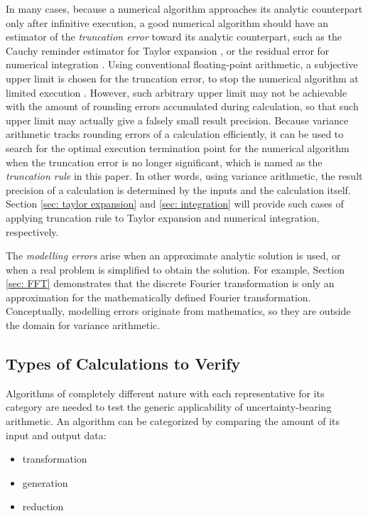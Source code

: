 \documentclass[twoside]{article}
\numberwithin{equation}{section}
\begin{document}
In many cases, because a numerical algorithm approaches its analytic counterpart only after infinitive execution, a good numerical algorithm should have an estimator of the \emph{truncation error} toward its analytic counterpart, such as the Cauchy reminder estimator for Taylor expansion \cite{Numerical_Recipes}, or the residual error for numerical integration \cite{Numerical_Recipes}.  
Using conventional floating-point arithmetic, a subjective upper limit is chosen for the truncation error, to stop the numerical algorithm at limited execution \cite{Numerical_Recipes}. 
However, such arbitrary upper limit may not be achievable with the amount of rounding errors accumulated during calculation, so that such upper limit may actually give a falsely small result precision. 
Because variance arithmetic tracks rounding errors of a calculation efficiently, it can be used to search for the optimal execution termination point for the numerical algorithm when the truncation error is no longer significant, which is named as the \emph{truncation rule} in this paper. In other words, using variance arithmetic, the result precision of a calculation is determined by the inputs and the calculation itself.  
Section \ref{sec: taylor expansion} and \ref{sec: integration} will provide such cases of applying truncation rule to Taylor expansion and numerical integration, respectively.

The \emph{modelling errors} arise when an approximate analytic solution is used, or when a real problem is simplified to obtain the solution.  
For example, Section \ref{sec: FFT} demonstrates that the discrete Fourier transformation is only an approximation for the mathematically defined Fourier transformation.  
Conceptually, modelling errors originate from mathematics, so they are outside the domain for variance arithmetic.


\subsection{Types of Calculations to Verify \cite{Prev_Precision_Arithmetic}}

Algorithms of completely different nature with each representative for its category are needed to test the generic applicability of uncertainty-bearing arithmetic.  
An algorithm can be categorized by comparing the amount of its input and output data:
\begin{itemize}
\item transformation
\item generation
\item reduction
\end{itemize}
\end{document}
